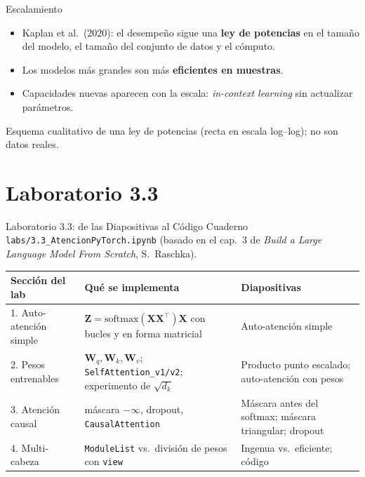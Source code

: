 \documentclass[aspectratio=169, 10pt]{beamer}
\newcommand{\softmax}{\mathrm{softmax}}
\begin{document}
\begin{frame}{Escalamiento}
	\begin{itemize}
		\item Kaplan et al.\ (2020): el desempe\~no sigue una \textbf{ley de potencias} en el tama\~no del modelo, el tama\~no del conjunto de datos y el c\'omputo.
		\item Los modelos m\'as grandes son m\'as \textbf{eficientes en muestras}.
		\item Capacidades nuevas aparecen con la escala: \emph{in-context learning} sin actualizar par\'ametros.
	\end{itemize}
	\begin{center}

		{\tiny Esquema cualitativo de una ley de potencias (recta en escala log--log); no son datos reales.}
	\end{center}
\end{frame}

\section{Laboratorio 3.3}

\begin{frame}{Laboratorio 3.3: de las Diapositivas al C\'odigo}
	\small
	Cuaderno \texttt{labs/3.3\_AtencionPyTorch.ipynb} (basado en el cap.\ 3 de \emph{Build a Large Language Model From Scratch}, S.\ Raschka).
	\begin{center}
		\scriptsize
		\begin{tabular}{p{4.2cm}p{4.3cm}p{4.2cm}}
			\toprule
			\textbf{Secci\'on del lab} & \textbf{Qu\'e se implementa} & \textbf{Diapositivas}\\
			\midrule
			1. Auto-atenci\'on simple & $\mathbf{Z}=\softmax(\mathbf{X}\mathbf{X}^\top)\mathbf{X}$ con bucles y en forma matricial & Auto-atenci\'on simple\\
			2. Pesos entrenables & $\mathbf{W}_q,\mathbf{W}_k,\mathbf{W}_v$; \texttt{SelfAttention\_v1/v2}; experimento de $\sqrt{d_k}$ & Producto punto escalado; auto-atenci\'on con pesos\\
			3. Atenci\'on causal & m\'ascara $-\infty$, dropout, \texttt{CausalAttention} & M\'ascara antes del softmax; m\'ascara triangular; dropout\\
			4. Multi-cabeza & \texttt{ModuleList} vs.\ divisi\'on de pesos con \texttt{view} & Ingenua vs.\ eficiente; c\'odigo\\
			\bottomrule
		\end{tabular}
	\end{center}
\end{frame}
\end{document}
